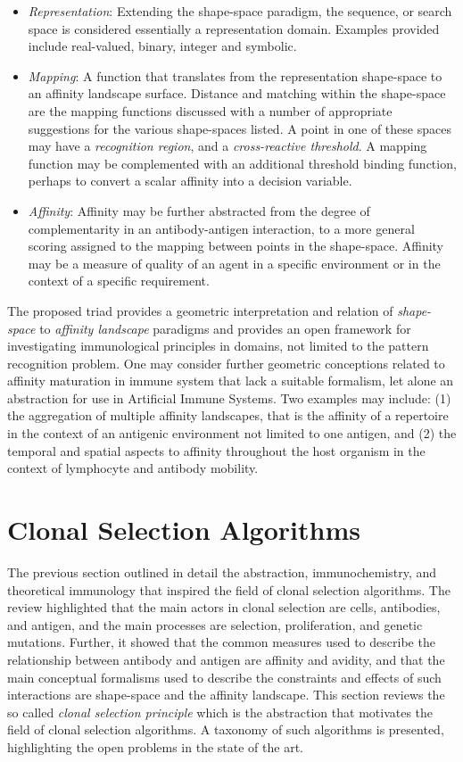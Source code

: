 \begin{itemize}
	\item \emph{Representation}: Extending the shape-space paradigm, the sequence, or search space is considered essentially a representation domain. Examples provided include real-valued, binary, integer and symbolic. 	
	\item \emph{Mapping}: A function that translates from the representation shape-space to an affinity landscape surface. Distance and matching within the shape-space are the mapping functions discussed with a number of appropriate suggestions for the various shape-spaces listed. A point in one of these spaces may have a \emph{recognition region}, and a \emph{cross-reactive threshold}. A mapping function may be complemented with an additional threshold binding function, perhaps to convert a scalar affinity into a decision variable.	
	\item \emph{Affinity}: Affinity may be further abstracted from the degree of complementarity in an antibody-antigen interaction, to a more general scoring assigned to the mapping between points in the shape-space. Affinity may be a measure of quality of an agent in a specific environment or in the context of a specific requirement.
\end{itemize}

The proposed triad provides a geometric interpretation and relation of \emph{shape-space} to \emph{affinity landscape} paradigms and provides an open framework for investigating immunological principles in domains, not limited to the pattern recognition problem. One may consider further geometric conceptions related to affinity maturation in immune system that lack a suitable formalism, let alone an abstraction for use in Artificial Immune Systems. Two examples may include: (1) the aggregation of multiple affinity landscapes, that is the affinity of a repertoire in the context of an antigenic environment not limited to one antigen, and (2) the temporal and spatial aspects to affinity throughout the host organism in the context of lymphocyte and antibody mobility.


%
%
\section{Clonal Selection Algorithms}
\label{sec:cs:algorithms}
The previous section outlined in detail the abstraction, immunochemistry, and theoretical immunology that inspired the field of clonal selection algorithms. The review highlighted that the main actors in clonal selection are cells, antibodies, and antigen, and the main processes are selection, proliferation, and genetic mutations. Further, it showed that the common measures used to describe the relationship between antibody and antigen are affinity and avidity, and that the main conceptual formalisms used to describe the constraints and effects of such interactions are shape-space and the affinity landscape. This section reviews the so called \emph{clonal selection principle} which is the abstraction that motivates the field of clonal selection algorithms. A taxonomy of such algorithms is presented, highlighting the open problems in the state of the art.

